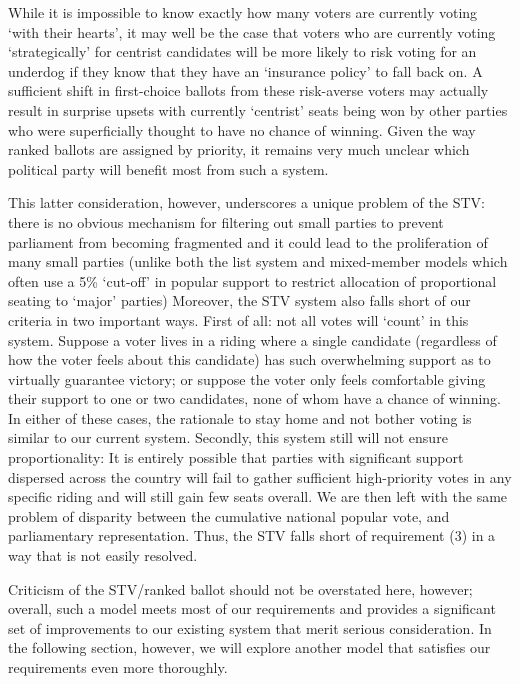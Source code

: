 \documentclass[DIV=calc, paper=a4, fontsize=11pt, twocolumn]{scrartcl}	 %
\begin{document}
While it is impossible to know exactly how many voters are currently voting `with their hearts', it may well be the case that voters who are currently voting `strategically' for centrist candidates will be more likely to risk voting for an underdog if they know that they have an `insurance policy' to fall back on. 
A sufficient shift in first-choice ballots from these risk-averse voters may actually result in surprise upsets with currently `centrist' seats being won by other parties who were superficially thought to have no chance of winning. Given the way ranked ballots are assigned by priority, it remains very much unclear which political party will benefit most from such a system. 

This latter consideration, however, underscores a unique problem of the STV:  there is no obvious mechanism for filtering out small parties to prevent parliament from becoming fragmented and it could lead to the proliferation of many small parties
(unlike both the list system and  mixed-member models which often use a 5\% `cut-off' in popular support to restrict allocation of proportional seating to `major' parties) 
Moreover, the STV system also falls short of our criteria in two important ways.
First of all: not all votes will `count' in this system. Suppose a voter lives in a riding where a single candidate (regardless of how the voter feels about this candidate) has such overwhelming support as to virtually guarantee victory; or suppose the voter only feels comfortable giving their support to one or two candidates, none of whom have a chance of winning. In either of these cases, the rationale to stay home and not bother voting is similar to our current system. 
Secondly, this system still will not ensure proportionality: It is entirely possible that parties with significant support dispersed across the country will fail to gather sufficient high-priority votes in any specific riding and will still gain few seats overall.  
We are then left with the same problem of disparity between the cumulative national popular vote, and parliamentary representation.
Thus, the STV falls short of requirement (3) in a way that is not easily resolved. 

Criticism of the STV/ranked ballot should not be overstated here, however; overall, such a model meets most of our requirements and provides a significant set of improvements to our existing system that merit serious consideration. In the following section, however, we will explore another model that satisfies our requirements even more thoroughly.
\end{document}
